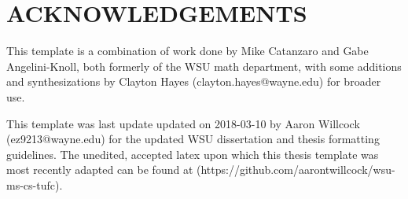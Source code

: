 \section*{ACKNOWLEDGEMENTS}
\begin{center}
This template is a combination of work done by Mike Catanzaro and Gabe Angelini-Knoll, both formerly of the WSU math department, with some additions and synthesizations by Clayton Hayes (clayton.hayes@wayne.edu) for broader use.

This template was last update updated on 2018-03-10 by Aaron Willcock (ez9213@wayne.edu) for the updated WSU dissertation and thesis formatting guidelines. The unedited, accepted latex upon which this thesis template was most recently adapted can be found at (https://github.com/aarontwillcock/wsu-ms-cs-tufc).
\end{center}